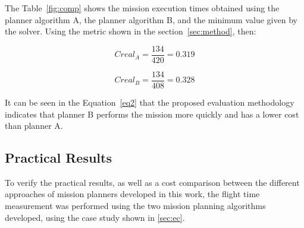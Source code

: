 \documentclass[conference,harvard,brazil,english]{sbatex}
\begin{document}
The Table~\ref{fig:comp} shows the mission execution times obtained using the planner algorithm A, the planner algorithm B, and the minimum value given by the solver. Using the metric shown in the section~\ref{sec:method}, then:

\begin{equation}
Creal_A=\frac{134}{420}=0.319
\label{eq1}
\end{equation}

\begin{equation}
Creal_B=\frac{134}{408}=0.328
\label{eq2}
\end{equation}

It can be seen in the Equation~\ref{eq2} that the proposed evaluation methodology indicates that planner B performs the mission more quickly and has a lower cost than planner A.

\subsection{Practical Results}

To verify the practical results, as well as a cost comparison between the different approaches of mission planners developed in this work, the flight time measurement was performed using the two mission planning algorithms developed, using the case study shown in \ref{sec:ec}.
%


\end{document}
